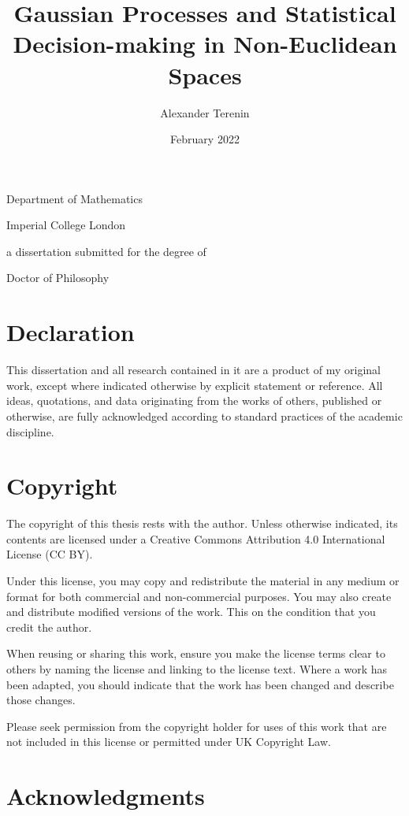 \documentclass[11pt]{book}
\title{Gaussian Processes and Statistical Decision-making in Non-Euclidean Spaces}
\author{Alexander Terenin}
\date{February 2022}
\begin{document}
\begin{titlepage}
\maketitlehooka
\centering
\huge
\null
\vfill
\thetitle
\par
\vfill
\LARGE
\theauthor
\par
\large
Department of Mathematics
\par
Imperial College London
\par
\vfill
\null
\vfill
a dissertation submitted for the degree of
\par
Doctor of Philosophy
\par
\strut
\par
\thedate
\par
\vfill
\null
\maketitlehookd
\end{titlepage}

\chapter*{Declaration}

This dissertation and all research contained in it are a product of my original work, except where indicated otherwise by explicit statement or reference.
All ideas, quotations, and data originating from the works of others, published or otherwise, are fully acknowledged according to standard practices of the academic discipline.

\chapter*{Copyright}

The copyright of this thesis rests with the author. Unless otherwise indicated, its contents are licensed under a Creative Commons Attribution 4.0 International License (CC BY).

Under this license, you may copy and redistribute the material in any medium or format for both commercial and non-commercial purposes. You may also create and distribute modified versions of the work. This on the condition that you credit the author.

When reusing or sharing this work, ensure you make the license terms clear to others by naming the license and linking to the license text. Where a work has been adapted, you should indicate that the work has been changed and describe those changes.

Please seek permission from the copyright holder for uses of this work that are not included in this license or permitted under UK Copyright Law.

\chapter*{Acknowledgments}
\end{document}
